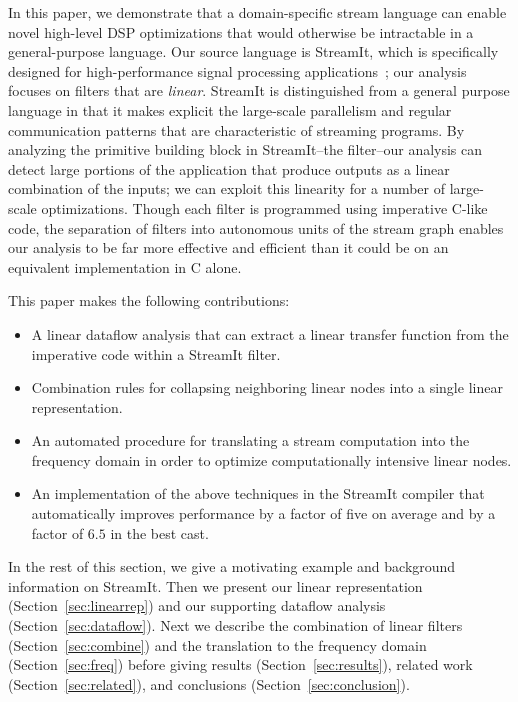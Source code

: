 In this paper, we demonstrate that a domain-specific stream language
can enable novel high-level DSP optimizations that would otherwise be
intractable in a general-purpose language.  Our source language is
StreamIt, which is specifically designed for high-performance signal
processing applications~\cite{streamit-asplos,streamitcc}; our
analysis focuses on filters that are {\it linear}.  StreamIt is
distinguished from a general purpose language in that it makes
explicit the large-scale parallelism and regular communication
patterns that are characteristic of streaming programs.  By analyzing
the primitive building block in StreamIt--the filter--our analysis can
detect large portions of the application that produce outputs as a
linear combination of the inputs; we can exploit this linearity
for a number of large-scale optimizations.  Though each filter is
programmed using imperative C-like code, the separation of filters
into autonomous units of the stream graph enables our analysis to be
far more effective and efficient than it could be on an equivalent
implementation in C alone.

This paper makes the following contributions:
\begin{itemize}

\item A linear dataflow analysis that can extract a linear transfer
function from the imperative code within a StreamIt filter.
\vspace{-6pt}

\item Combination rules for collapsing neighboring linear nodes into a
single linear representation.
\vspace{-6pt}

\item An automated procedure for translating a stream computation into
the frequency domain in order to optimize computationally intensive
linear nodes.
\vspace{-6pt}

\item An implementation of the above techniques in the StreamIt
compiler that automatically improves performance by a factor of
five on average and by a factor of $6.5$ in the best cast.

\end{itemize}

In the rest of this section, we give a motivating example and
background information on StreamIt.  Then we present our linear
representation (Section~\ref{sec:linearrep}) and our 
supporting dataflow analysis (Section~\ref{sec:dataflow}).  
Next we describe the
combination of linear filters (Section~\ref{sec:combine}) and the
translation to the frequency domain (Section~\ref{sec:freq}) before
giving results (Section~\ref{sec:results}), related work
(Section~\ref{sec:related}), and conclusions
(Section~\ref{sec:conclusion}).

